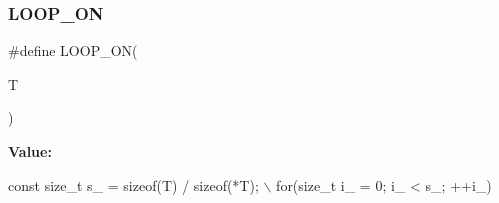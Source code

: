 \subsubsection{\texorpdfstring{L\+O\+O\+P\+\_\+\+ON}{LOOP\_ON}}
{\footnotesize\ttfamily \#define L\+O\+O\+P\+\_\+\+ON(\begin{DoxyParamCaption}\item[{}]{T }\end{DoxyParamCaption})}

{\bfseries Value\+:}
\begin{DoxyCode}
\textcolor{keyword}{const} \textcolor{keywordtype}{size\_t} s\_ = \textcolor{keyword}{sizeof}(T) / \textcolor{keyword}{sizeof}(*T);  \(\backslash\)
  for(\textcolor{keywordtype}{size\_t} i\_ = 0; i\_ < s\_; ++i\_)
\end{DoxyCode}
